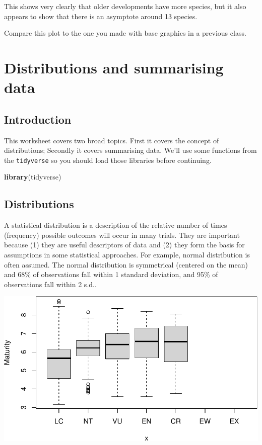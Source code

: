 \documentclass[
  a4paperpaper,
]{book}
\newenvironment{Shaded}{\begin{snugshade}}{\end{snugshade}}
\newcommand{\KeywordTok}[1]{\textcolor[rgb]{0.13,0.29,0.53}{\textbf{#1}}}
\newcommand{\NormalTok}[1]{#1}
\begin{document}
This shows very clearly that older developments have more species, but it also appears to show that there is an asymptote around 13 species.

Compare this plot to the one you made with base graphics in a previous class.

\hypertarget{distributions-and-summarising-data}{%
\chapter{Distributions and summarising data}\label{distributions-and-summarising-data}}

\hypertarget{introduction}{%
\section{Introduction}\label{introduction}}

This worksheet covers two broad topics. First it covers the concept of distributions; Secondly it covers summarising data. We'll use some functions from the \texttt{tidyverse} so you should load those libraries before continuing.

\begin{Shaded}
\begin{Highlighting}[]
\KeywordTok{library}\NormalTok{(tidyverse)}
\end{Highlighting}
\end{Shaded}

\hypertarget{distributions}{%
\section{Distributions}\label{distributions}}

A statistical distribution is a description of the relative number of times (frequency) possible outcomes will occur in many trials. They are important because (1) they are useful descriptors of data and (2) they form the basis for assumptions in some statistical approaches. For example, normal distribution is often assumed. The normal distribution is symmetrical (centered on the mean) and 68\% of observations fall within 1 standard deviation, and 95\% of observations fall within 2 s.d..

\begin{center}\includegraphics{BB852_files/figure-latex/unnamed-chunk-92-1} \end{center}
\end{document}
